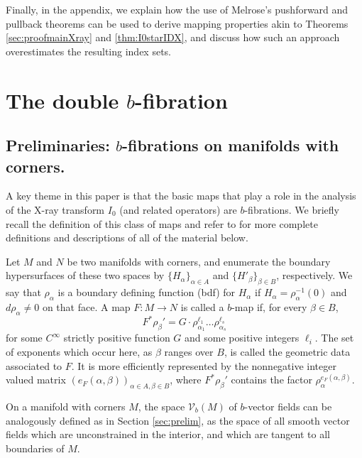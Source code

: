 Finally, in the appendix, we explain how the use of Melrose's pushforward and pullback theorems can be used to derive mapping properties akin to Theorems \ref{sec:proofmainXray} and \ref{thm:I0starIDX}, and discuss how such an approach overestimates the resulting index sets.

\section{The double \texorpdfstring{$b$}{b}-fibration} \label{sec:doubleb}

\subsection{Preliminaries: $b$-fibrations on manifolds with corners.} \label{sec:bfib}

A key theme in this paper is that the basic maps that play a role in the analysis of the X-ray transform $I_0$
(and related operators) are $b$-fibrations. We briefly recall the definition of this class of maps and refer to
\cite{Grieser2001,Melrose1992, Mazzeo1991} for more complete definitions and descriptions of all of the material below.

Let $M$ and $N$ be two manifolds with corners, and enumerate the boundary hypersurfaces of these two spaces by $\{H_\alpha\}_{\alpha \in A}$
and $\{H'_\beta\}_{\beta \in B}$, respectively. We say that $\rho_\alpha$ is a boundary defining function (bdf) for $H_\alpha$ if
$H_\alpha = \rho_\alpha^{-1}(0)$ and $d\rho_\alpha \neq 0$ on that face. A map $F: M \to N$ is called a $b$-map if, for every $\beta \in B$,
\[
F^* \rho_\beta' = G \cdot \rho_{\alpha_1}^{\ell_1} \ldots \rho_{\alpha_s}^{\ell_s}
\]
for some $C^\infty$ strictly positive function $G$ and some positive integers $\ell_i$. The set of exponents which occur here,
as $\beta$ ranges over $B$, is called the geometric data associated to $F$. It is more efficiently represented by the nonnegative
integer valued matrix $(e_F(\alpha, \beta))_{\alpha\in A, \beta\in B}$, where $F^*\rho_\beta'$ contains the factor $\rho_\alpha^{e_F(\alpha, \beta)}$.

On a manifold with corners $M$, the space $\mathcal V_b(M)$ of $b$-vector fields can be analogously defined as in Section \ref{sec:prelim}, as the space of all smooth vector fields which are unconstrained in the interior, and which are tangent to all boundaries of $M$.

